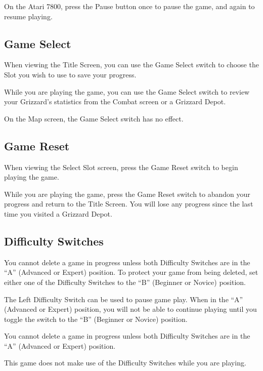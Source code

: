 \documentclass[10pt,twocolumn,openany,article]{memoir}
\begin{document}
On the Atari  7800, press the Pause  button once to pause  the game, and
again to resume playing.

\fi

\subsection{Game Select}

When viewing  the Title Screen,  you can use  the Game Select  switch to
choose the Slot you wish to use to save your progress.

While you are  playing the game, you  can use the Game  Select switch to
review   your  Grizzard's   statistics   from  the   Combat  screen   or
a Grizzard Depot.

On the Map screen, the Game Select switch has no effect.

\subsection{Game Reset}

When viewing  the Select  Slot screen,  press the  Game Reset  switch to
begin playing the game.

While you are  playing the game, press the Game  Reset switch to abandon
your progress and return to the Title Screen. You will lose any progress
since the last time you visited a Grizzard Depot.

\subsection{Difficulty Switches}

You cannot delete a game in progress unless both Difficulty Switches are
in the  ``A'' (Advanced or Expert)  position. To protect your  game from
being deleted,  set either one of  the Difficulty Switches to  the ``B''
(Beginner or Novice) position.

\ifdefined\TVSECAM

The Left Difficulty Switch  can be used to pause game  play. When in the
``A'' (Advanced  or Expert) position, you  will not be able  to continue
playing  until  you  toggle  the   switch  to  the  ``B''  (Beginner  or
Novice) position.

You cannot delete a game in progress unless both Difficulty Switches are
in the ``A'' (Advanced or Expert) position.

\else

This  game does  not  make  use of  the  Difficulty  Switches while  you
are playing. 
\end{document}
